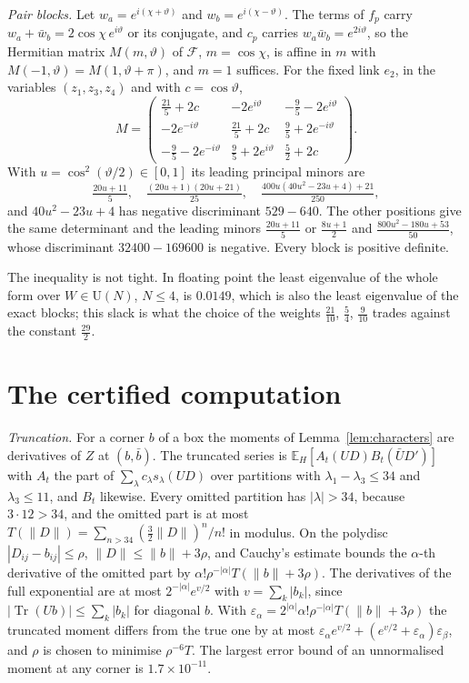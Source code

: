 \documentclass[11pt]{amsart}
\theoremstyle{definition}
\theoremstyle{remark}
\numberwithin{equation}{section}
\newcommand{\E}{\mathbb{E}}
\newcommand{\U}{\mathrm{U}}
\newcommand{\Tr}{\operatorname{Tr}}
\begin{document}
\emph{Pair blocks.} Let $w_a=e^{i(\chi+\vartheta)}$ and $w_b=e^{i(\chi-\vartheta)}$.
The terms of $f_p$ carry $w_a+\bar w_b=2\cos\chi\,e^{i\vartheta}$ or its
conjugate, and $c_p$ carries $w_a\bar w_b=e^{2i\vartheta}$, so the Hermitian
matrix $M(m,\vartheta)$ of $\mathcal F$, $m=\cos\chi$, is affine in $m$ with
$M(-1,\vartheta)=M(1,\vartheta+\pi)$, and $m=1$ suffices. For the fixed link
$e_2$, in the variables $(z_1,z_3,z_4)$ and with $c=\cos\vartheta$,
\[
M=\begin{pmatrix}\frac{21}5+2c&-2e^{i\vartheta}&-\frac95-2e^{i\vartheta}\\[2pt]
-2e^{-i\vartheta}&\frac{21}5+2c&\frac95+2e^{-i\vartheta}\\[2pt]
-\frac95-2e^{-i\vartheta}&\frac95+2e^{i\vartheta}&\frac52+2c\end{pmatrix}.
\]
With $u=\cos^2(\vartheta/2)\in[0,1]$ its leading principal minors are
\[
\tfrac{20u+11}5,\quad\tfrac{(20u+1)(20u+21)}{25},\quad
\tfrac{400u(40u^2-23u+4)+21}{250},
\]
and $40u^2-23u+4$ has negative discriminant $529-640$. The other positions
give the same determinant and the leading minors $\frac{20u+11}5$ or
$\frac{8u+1}2$ and $\frac{800u^2-180u+53}{50}$, whose discriminant $32400-169600$
is negative. Every block is positive definite.

The inequality is not tight. In floating point the least eigenvalue of the
whole form over $W\in\U(N)$, $N\le4$, is $0.0149$, which is also the least
eigenvalue of the exact blocks; this slack is what the choice of the weights
$\frac{21}{10}$, $\frac54$, $\frac9{10}$ trades against the constant
$\frac{29}2$.

\section{The certified computation}\label{app:cover}

\emph{Truncation.} For a corner $b$ of a box the moments of
Lemma~\ref{lem:characters} are derivatives of $Z$ at $(b,\bar b)$. The
truncated series is $\E_H[A_t(UD)B_t(\bar UD')]$ with $A_t$ the part of
$\sum_\lambda c_\lambda s_\lambda(UD)$ over partitions with $\lambda_1-\lambda_3\le34$ and
$\lambda_3\le11$, and $B_t$ likewise. Every omitted partition has $|\lambda|>34$,
because $3\cdot12>34$, and the omitted part is at most $T(\|D\|)=\sum_{n>34}
(\frac32\|D\|)^n/n!$ in modulus. On the polydisc $|D_{ij}-b_{ij}|\le\rho$,
$\|D\|\le\|b\|+3\rho$, and Cauchy's estimate bounds the $\alpha$-th derivative
of the omitted part by $\alpha!\rho^{-|\alpha|}T(\|b\|+3\rho)$. The
derivatives of the full exponential are at most $2^{-|\alpha|}e^{v/2}$ with
$v=\sum_k|b_k|$, since $|\Tr(Ub)|\le\sum_k|b_k|$ for diagonal $b$. With
$\varepsilon_\alpha=2^{|\alpha|}\alpha!\rho^{-|\alpha|}T(\|b\|+3\rho)$ the
truncated moment differs from the true one by at most $\varepsilon_\alpha e^{v/2}
+(e^{v/2}+\varepsilon_\alpha)\varepsilon_\beta$, and $\rho$ is chosen to minimise
$\rho^{-6}T$. The largest error bound of an unnormalised moment at any corner is
$1.7\times10^{-11}$.
\end{document}
